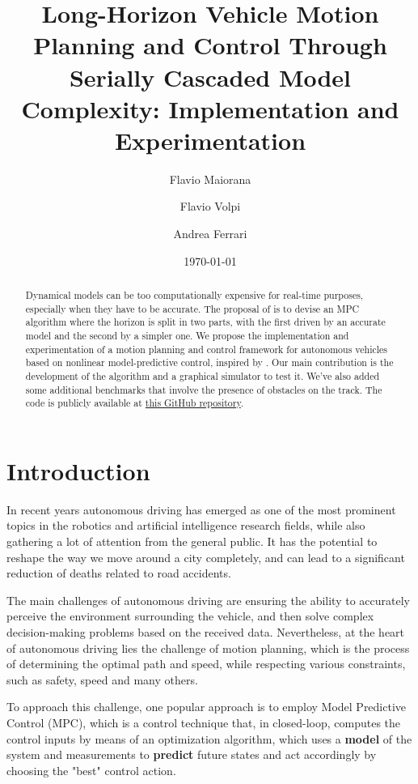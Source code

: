 \documentclass[a4paper, onecolumn, 11pt]{article}
\title{Long-Horizon Vehicle Motion Planning and Control Through Serially Cascaded Model Complexity: Implementation and Experimentation}
\author{Flavio Maiorana \and Flavio Volpi \and Andrea Ferrari}
\date{\today}
\begin{document}
\maketitle
\begin{abstract}
    Dynamical models can be too computationally expensive for real-time
    purposes, especially when they have to be accurate. The proposal of
    \cite{paper} is to devise an MPC algorithm where the horizon is split in two
    parts, with the first driven by an accurate model and the second by a
    simpler one. We propose the implementation and experimentation of a motion
    planning and control framework for autonomous vehicles based on nonlinear
    model-predictive control, inspired by \cite{paper}. Our main contribution is
    the development of the algorithm and a graphical simulator to test it. We've
    also added some additional benchmarks that involve the presence of obstacles
    on the track. The code is publicly available at
    \href{https://github.com/neverorfrog/vehicle-control}{this GitHub
    repository}.
\end{abstract}

\newpage
\tableofcontents

\newpage
\section{Introduction}

In recent years autonomous driving has emerged as one of the most prominent
topics in the robotics and artificial intelligence research fields, while also
gathering a lot of attention from the general public. It has the potential to
reshape the way we move around a city completely, and can lead to a significant
reduction of deaths related to road accidents.

The main challenges of autonomous driving are ensuring the ability to accurately
perceive the environment surrounding the vehicle, and then solve complex
decision-making problems based on the received data. Nevertheless,  at the heart
of autonomous driving lies the challenge of motion planning, which is the
process of determining the optimal path and speed, while respecting various
constraints, such as safety, speed and many others.

To approach this challenge, one popular approach is to employ Model Predictive
Control (MPC), which is a control technique that, in closed-loop, computes the
control inputs by means of an optimization algorithm, which uses a
\textbf{model} of the system and measurements to \textbf{predict} future states
and act accordingly by choosing the "best" control action. 
\end{document}
